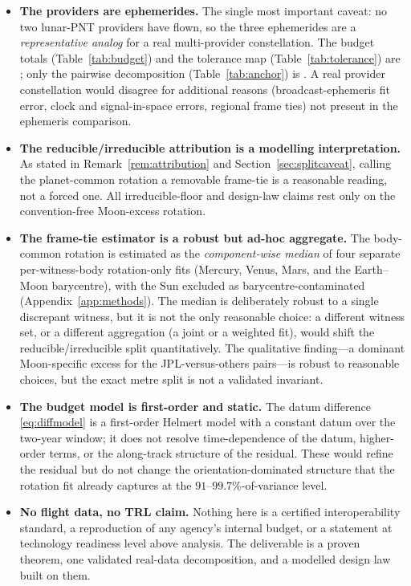 \begin{itemize}
  \item \textbf{The providers are ephemerides.} The single most important caveat:
  no two lunar-PNT providers have flown, so the three ephemerides are a
  \emph{representative analog} for a real multi-provider constellation. The budget
  totals (Table~\ref{tab:budget}) and the tolerance map (Table~\ref{tab:tolerance})
  are \Modelled{}; only the pairwise decomposition (Table~\ref{tab:anchor}) is
  \Validated{}. A real provider constellation would disagree for additional reasons
  (broadcast-ephemeris fit error, clock and signal-in-space errors, regional frame
  ties) not present in the ephemeris comparison.

  \item \textbf{The reducible/irreducible attribution is a modelling
  interpretation.} As stated in Remark~\ref{rem:attribution} and
  Section~\ref{sec:splitcaveat}, calling the planet-common rotation a removable
  frame-tie is a reasonable reading, not a forced one. All irreducible-floor and
  design-law claims rest only on the convention-free Moon-excess rotation.

  \item \textbf{The frame-tie estimator is a robust but ad-hoc aggregate.} The
  body-common rotation is estimated as the \emph{component-wise median} of four
  separate per-witness-body rotation-only fits (Mercury, Venus, Mars, and the
  Earth--Moon barycentre), with the Sun excluded as barycentre-contaminated
  (Appendix~\ref{app:methods}). The median is deliberately robust to a single
  discrepant witness, but it is not the only reasonable choice: a different witness
  set, or a different aggregation (a joint or a weighted fit), would shift the
  reducible/irreducible split quantitatively. The qualitative finding---a dominant
  Moon-specific excess for the JPL-versus-others pairs---is robust to reasonable
  choices, but the exact metre split is not a validated invariant.

  \item \textbf{The budget model is first-order and static.} The datum difference
  \eqref{eq:diffmodel} is a first-order Helmert model with a constant datum over the
  two-year window; it does not resolve time-dependence of the datum, higher-order
  terms, or the along-track structure of the residual. These would refine the residual
  but do not change the orientation-dominated structure that the rotation fit already
  captures at the $91$--$99.7\%$-of-variance level.

  \item \textbf{No flight data, no TRL claim.} Nothing here is a certified
  interoperability standard, a reproduction of any agency's internal budget, or a
  statement at technology readiness level above analysis. The deliverable is a proven
  theorem, one validated real-data decomposition, and a modelled design law built on
  them.
\end{itemize}

